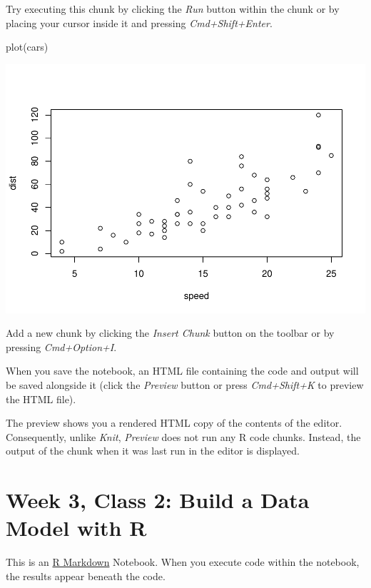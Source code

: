 \documentclass[
]{book}
\newenvironment{Shaded}{\begin{snugshade}}{\end{snugshade}}
\newcommand{\FunctionTok}[1]{\textcolor[rgb]{0.00,0.00,0.00}{#1}}
\newcommand{\NormalTok}[1]{#1}
\begin{document}
Try executing this chunk by clicking the \emph{Run} button within the chunk or by placing your cursor inside it and pressing \emph{Cmd+Shift+Enter}.

\begin{Shaded}
\begin{Highlighting}[]
\FunctionTok{plot}\NormalTok{(cars)}
\end{Highlighting}
\end{Shaded}

\includegraphics{_main_files/figure-latex/unnamed-chunk-30-1.pdf}

Add a new chunk by clicking the \emph{Insert Chunk} button on the toolbar or by pressing \emph{Cmd+Option+I}.

When you save the notebook, an HTML file containing the code and output will be saved alongside it (click the \emph{Preview} button or press \emph{Cmd+Shift+K} to preview the HTML file).

The preview shows you a rendered HTML copy of the contents of the editor. Consequently, unlike \emph{Knit}, \emph{Preview} does not run any R code chunks. Instead, the output of the chunk when it was last run in the editor is displayed.

\hypertarget{week-3-class-2-build-a-data-model-with-r}{%
\chapter{Week 3, Class 2: Build a Data Model with R}\label{week-3-class-2-build-a-data-model-with-r}}

This is an \href{http://rmarkdown.rstudio.com}{R Markdown} Notebook. When you execute code within the notebook, the results appear beneath the code.
\end{document}
